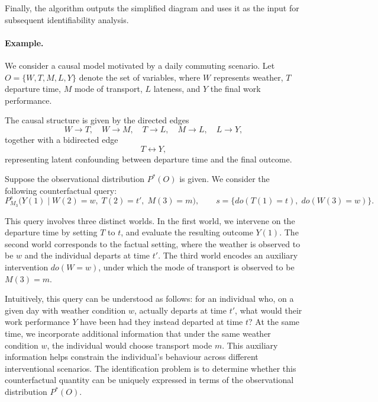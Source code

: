 \documentclass[a4paper]{report}
\begin{document}
Finally, the algorithm outputs the simplified diagram and uses it as the input for subsequent 
identifiability analysis.

\paragraph{Example.}
We consider a causal model motivated by a daily commuting scenario. Let 
$O = \{W, T, M, L, Y\}$ denote the set of variables, where $W$ represents 
weather, $T$ departure time, $M$ mode of transport, $L$ lateness, and $Y$ 
the final work performance.

The causal structure is given by the directed edges
\[
W \to T, \quad W \to M, \quad T \to L, \quad M \to L, \quad L \to Y,
\]
together with a bidirected edge
\[
T \leftrightarrow Y,
\]
representing latent confounding between departure time and the final outcome.

Suppose the observational distribution $P^*(O)$ is given. We consider the 
following counterfactual query:
\[
P^s_{M_3}\!\bigl(
Y(1)\mid W(2)=w,\; T(2)=t',\; M(3)=m
\bigr),
\qquad
s=\{do(T(1)=t),\; do(W(3)=w)\}.
\]

This query involves three distinct worlds. In the first world, we intervene on the departure time by setting $T$ to $t$, and evaluate the resulting outcome $Y(1)$. The second world corresponds to the factual setting, where the weather is observed to be $w$ and the individual departs at time $t'$. The third world encodes an auxiliary intervention $do(W=w)$, under which the mode of transport is observed to be $M(3)=m$.

Intuitively, this query can be understood as follows: for an individual who, on a given day with weather condition $w$, actually departs at time $t'$, what would their work performance $Y$ have been had they instead departed at time $t$? At the same time, we incorporate additional information that under the same weather condition $w$, the individual would choose transport mode $m$. This auxiliary information helps constrain the individual's behaviour across different interventional scenarios. The identification problem is to determine whether this counterfactual quantity can be uniquely expressed in terms of the observational 
distribution $P^*(O)$.
\end{document}
